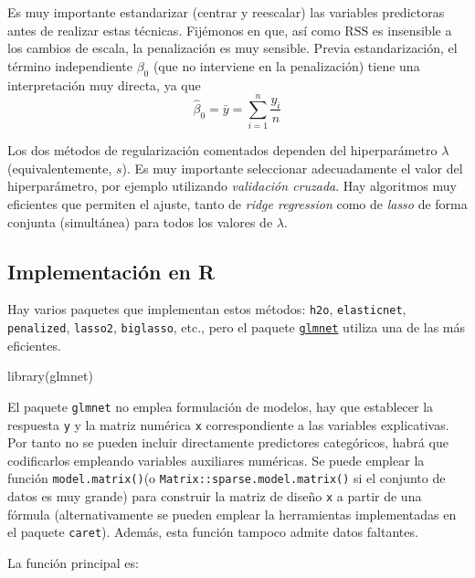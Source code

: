 \documentclass[
  spanish,
]{book}
\newenvironment{Shaded}{\begin{snugshade}}{\end{snugshade}}
\newcommand{\FunctionTok}[1]{\textcolor[rgb]{0.00,0.00,0.00}{#1}}
\newcommand{\NormalTok}[1]{#1}
\theoremstyle{break}
\theoremstyle{definition}
\theoremstyle{definition}
\theoremstyle{definition}
\theoremstyle{definition}
\theoremstyle{remark}
\begin{document}
Es muy importante estandarizar (centrar y reescalar) las variables predictoras antes de realizar estas técnicas.
Fijémonos en que, así como \(\mbox{RSS}\) es insensible a los cambios de escala, la penalización es muy sensible.
Previa estandarización, el término independiente \(\beta_0\) (que no interviene en la penalización) tiene una interpretación muy directa, ya que
\[\widehat \beta_0 = \bar y =\sum_{i=1}^n \frac{y_i}{n}\]

Los dos métodos de regularización comentados dependen del hiperparámetro \(\lambda\) (equivalentemente, \(s\)).
Es muy importante seleccionar adecuadamente el valor del hiperparámetro, por ejemplo utilizando \emph{validación cruzada}.
Hay algoritmos muy eficientes que permiten el ajuste, tanto de \emph{ridge regression} como de \emph{lasso} de forma conjunta (simultánea) para todos los valores de \(\lambda\).

\hypertarget{implementaciuxf3n-en-r}{%
\subsection{Implementación en R}\label{implementaciuxf3n-en-r}}

Hay varios paquetes que implementan estos métodos: \texttt{h2o}, \texttt{elasticnet}, \texttt{penalized}, \texttt{lasso2}, \texttt{biglasso}, etc., pero el paquete \href{https://glmnet.stanford.edu}{\texttt{glmnet}} utiliza una de las más eficientes.

\begin{Shaded}
\begin{Highlighting}[]
\FunctionTok{library}\NormalTok{(glmnet)}
\end{Highlighting}
\end{Shaded}

El paquete \texttt{glmnet} no emplea formulación de modelos, hay que establecer la respuesta \texttt{y} y la matriz numérica \texttt{x} correspondiente a las variables explicativas.
Por tanto no se pueden incluir directamente predictores categóricos, habrá que codificarlos empleando variables auxiliares numéricas.
Se puede emplear la función \texttt{model.matrix()}(o \texttt{Matrix::sparse.model.matrix()} si el conjunto de datos es muy grande) para construir la matriz de diseño \texttt{x} a partir de una fórmula (alternativamente se pueden emplear la herramientas implementadas en el paquete \texttt{caret}). Además, esta función tampoco admite datos faltantes.

La función principal es:
\end{document}
